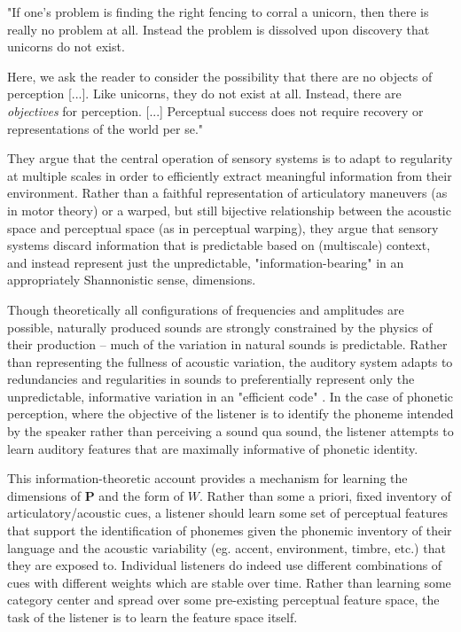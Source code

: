 \begin{multicols}{2}
\begin{leftbar}
"If one's problem is finding the right fencing to corral a unicorn, then there is really no problem at all. Instead the problem is dissolved upon discovery that unicorns do not exist.

Here, we ask the reader to consider the possibility that there are no objects of perception [...]. Like unicorns, they do not exist at all. Instead, there are \textit{objectives} for perception. [...] Perceptual success does not require recovery or representations of the world per se." \cite{kluenderLongstandingProblemsSpeech2019a}
\end{leftbar}

They argue that the central operation of sensory systems is to adapt to regularity at multiple scales in order to efficiently extract meaningful information from their environment. Rather than a faithful representation of articulatory maneuvers (as in motor theory) or a warped, but still bijective relationship between the acoustic space and perceptual space (as in perceptual warping), they argue that sensory systems discard information that is predictable based on (multiscale) context, and instead represent just the unpredictable, "information-bearing" in an appropriately Shannonistic sense, dimensions. 

Though theoretically all configurations of frequencies and amplitudes are possible, naturally produced sounds are strongly constrained by the physics of their production -- much of the variation in natural sounds is predictable. Rather than representing the fullness of acoustic variation, the auditory system adapts to redundancies and regularities in sounds to preferentially represent only the unpredictable, informative variation in an "efficient code" \cite{smithEfficientAuditoryCoding2006a,Geffen2011}. In the case of phonetic perception, where the objective of the listener is to identify the phoneme intended by the speaker rather than perceiving a sound qua sound, the listener attempts to learn auditory features that are maximally informative of phonetic identity\cite{kiefteAbsorptionReliableSpectral2008,liuOptimalFeaturesAuditory2019,kluenderLongstandingProblemsSpeech2019a,kluenderPerceptionVowelSounds2013}.

This information-theoretic account provides a mechanism for learning the dimensions of $\mathbf{P}$ and the form of $W$. Rather than some a priori, fixed inventory of articulatory/acoustic cues, a listener should learn some set of perceptual features that support the identification of phonemes given the phonemic inventory of their language and the acoustic variability (eg. accent, environment, timbre, etc.) that they are exposed to. Individual listeners do indeed use different combinations of cues with different weights\cite{iversonInfluencesPhoneticIdentification1996} which are stable over time\cite{souzaReliabilityRepeatabilitySpeech2018}. Rather than learning some category center and spread over some pre-existing perceptual feature space, the task of the listener is to learn the feature space itself. 


\end{multicols}
